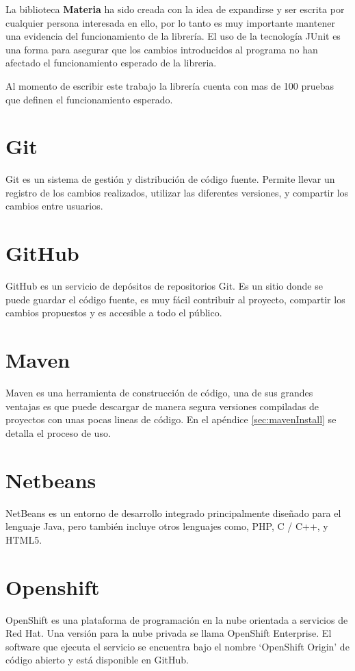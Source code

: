 		 La biblioteca \textbf{Materia} ha sido creada con la idea de expandirse y ser escrita por cualquier persona interesada en ello, por lo tanto es muy importante mantener una evidencia del funcionamiento de la librería. El uso de la tecnología JUnit es una forma para asegurar que los cambios introducidos al programa no han afectado el funcionamiento esperado de la libreria.

		Al momento de escribir este trabajo la librería cuenta con mas de 100 pruebas que definen el funcionamiento esperado.

	\section{Git}

		Git es un sistema de gestión y distribución de código fuente. Permite llevar un registro de los cambios realizados, utilizar las diferentes versiones, y compartir los cambios entre usuarios.

	\section{GitHub}

		GitHub es un servicio de depósitos de repositorios Git. Es un sitio donde se puede guardar el código fuente, es muy fácil contribuir al proyecto, compartir los cambios propuestos y es accesible a todo el público.

	\section{Maven}

		Maven es una herramienta de construcción de código, una de sus grandes ventajas es que puede descargar de manera segura versiones compiladas de proyectos con unas pocas lineas de código. En el apéndice \ref{sec:mavenInstall}  se detalla el proceso de uso.

	\section{Netbeans}
		NetBeans es un entorno de desarrollo integrado principalmente diseñado para el lenguaje Java, pero también incluye otros lenguajes como, PHP, C / C++, y HTML5. 

	\section{Openshift}
		OpenShift es una plataforma de programación en la nube orientada a servicios de Red Hat. Una versión para la nube privada se llama OpenShift Enterprise. El software que ejecuta el servicio se encuentra bajo el nombre `OpenShift Origin' de código abierto y está disponible en GitHub.

